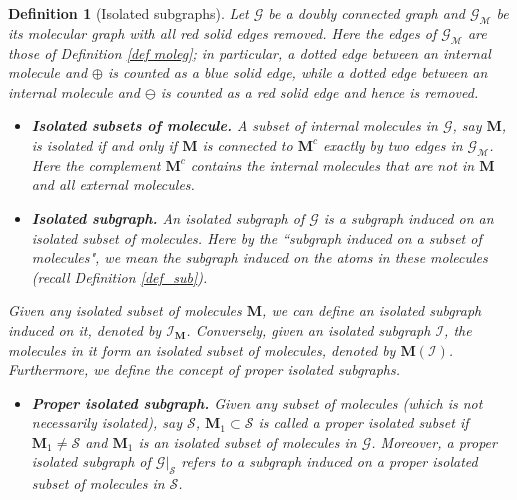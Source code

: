\documentclass{article}
\newcommand{\1}{\mathds{1}}
\numberwithin{equation}{section}
\renewcommand{\cal}{\mathcal}
\theoremstyle{plain} %
\newtheorem{definition}[theorem]{Definition}
\theoremstyle{remark}
\newcommand{\cor}{\color{red}}
\newcommand{\Pol}{{\mathbf{M}}}
\newcommand{\Iso}{{\mathcal I}}
\newcommand{\hty}[1]{{\cor (ht: #1) }}
\begin{document}
\begin{definition}[Isolated subgraphs]\label{defn iso}
Let $\cal G$ be a doubly connected graph and $\cal G_{\cal M}$ be its molecular graph with all red solid edges removed. Here the edges of $\cal G_{\cal M}$ are those of Definition \ref{def moleg}; in particular, a dotted edge between an internal molecule and $\oplus$ is counted as a blue solid edge, while a dotted edge between an internal molecule and $\ominus$ is counted as a red solid edge and hence is removed. %
\begin{itemize}
\item {\bf Isolated subsets of molecule.} A subset of internal molecules in $\cal G$, say $\Pol$, is \emph{isolated} if and only if $\Pol$ is connected to $\Pol^c$ exactly by two edges %
in $\cal G_{\cal M}$. Here the complement $\Pol^c$ contains the internal molecules that are not in $\Pol$ and all external molecules. 


\item {\bf Isolated subgraph.} An isolated subgraph of $\cal G$ is a subgraph induced on an isolated subset of molecules. Here by the ``subgraph induced on a subset of molecules", we mean the subgraph induced on the atoms in these molecules (recall Definition \ref{def_sub}).
\end{itemize}
Given any isolated subset of molecules $\Pol$, we can define an isolated subgraph induced on it, denoted by $\Iso_{\Pol}$. 
Conversely, given an isolated subgraph $\Iso$, the molecules in it form an isolated subset of molecules, denoted by $\Pol(\Iso)$. Furthermore, we define the concept of proper isolated subgraphs.
\begin{itemize}

\item{\bf Proper isolated subgraph.} Given any subset of molecules (which is not necessarily isolated), say $\cal S$, $\Pol_1\subset \cal S$ is called a \emph{proper isolated subset} if $\Pol_1\ne \cal S$ and $\Pol_1$ is an isolated subset of molecules in $\cal G$. Moreover, %
a proper isolated subgraph of ${\cal G}|_{\cal S}$ refers to a subgraph induced on a proper isolated subset of molecules in $\cal S$.  
\end{itemize}


 \end{definition}
\end{document}
